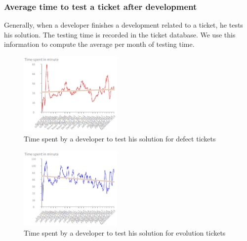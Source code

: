 \documentclass[10pt,conference]{IEEEtran}
\begin{document}
\subsubsection{Average time  to test a ticket after development}
Generally, when a developer finishes a development related to a ticket, he tests his solution.  
The testing time is recorded in the ticket database.
 We use this information to compute the average per month of testing time. 
 \begin{figure}[H]
  \centering
  \includegraphics[width=50mm]{./images/timeDevTest.png}
  \caption{Time spent by a developer to test his solution for  defect tickets}
  \label{fig:devTimeTestBug}
\end{figure}
\begin{figure}[H]
  \centering
  \includegraphics[width=50mm]{./images/evolutionTest.png}
  \caption{Time spent by a developer to test his solution for  evolution tickets}
  \label{fig:devTimeTestEvol}
\end{figure}
\end{document}
